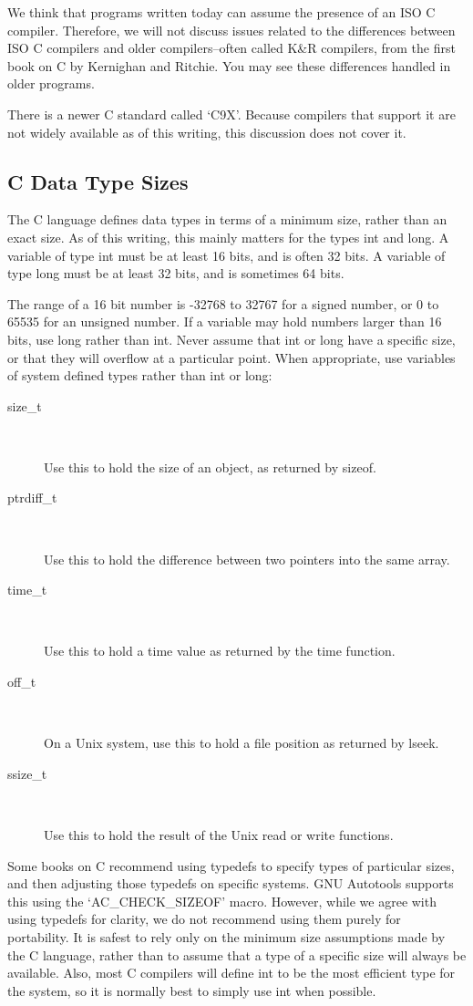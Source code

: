 We think that programs written today can assume the presence of an ISO C compiler. Therefore, we will not discuss issues related to the differences between ISO C compilers and older compilers--often called K\&R compilers, from the first book on C by Kernighan and Ritchie. You may see these differences handled in older programs.

There is a newer C standard called `C9X'. Because compilers that support it are not widely available as of this writing, this discussion does not cover it. 

\subsection{C Data Type Sizes}

The C language defines data types in terms of a minimum size, rather than an exact size. As of this writing, this mainly matters for the types int and long. A variable of type int must be at least 16 bits, and is often 32 bits. A variable of type long must be at least 32 bits, and is sometimes 64 bits.

The range of a 16 bit number is -32768 to 32767 for a signed number, or 0 to 65535 for an unsigned number. If a variable may hold numbers larger than 16 bits, use long rather than int. Never assume that int or long have a specific size, or that they will overflow at a particular point. When appropriate, use variables of system defined types rather than int or long: 

\begin{description}
\item [size\_{}t]
\

    Use this to hold the size of an object, as returned by sizeof. 
\item[ptrdiff\_{}t]
\

    Use this to hold the difference between two pointers into the same array. 
\item[time\_{}t]
\

    Use this to hold a time value as returned by the time function. 
\item[off\_{}t]
\

    On a Unix system, use this to hold a file position as returned by lseek. 
\item[ssize\_{}t]
\

    Use this to hold the result of the Unix read or write functions.
\end{description}

Some books on C recommend using typedefs to specify types of particular sizes, and then adjusting those typedefs on specific systems. GNU Autotools supports this using the `AC\_{}CHECK\_{}SIZEOF' macro. However, while we agree with using typedefs for clarity, we do not recommend using them purely for portability. It is safest to rely only on the minimum size assumptions made by the C language, rather than to assume that a type of a specific size will always be available. Also, most C compilers will define int to be the most efficient type for the system, so it is normally best to simply use int when possible.

